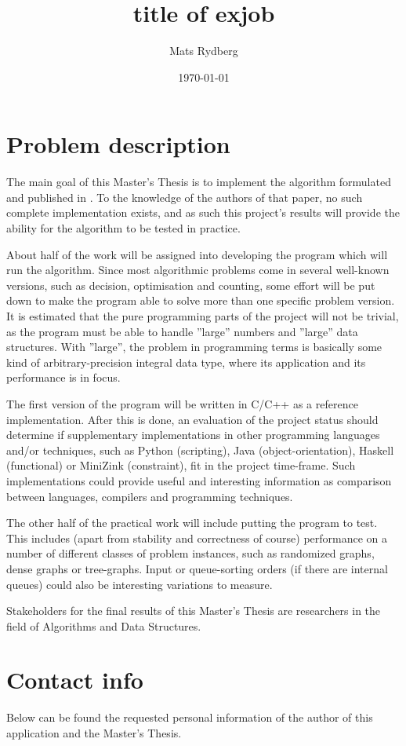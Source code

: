 \documentclass[a4paper, titlepage]{article}
\title{\huge{title of exjob}}
\author{Mats Rydberg}
\date{\today}
\begin{document}
\maketitle

\section*{Problem description}
The main goal of this Master's Thesis is to implement the algorithm formulated and published in \cite{covering}. To the knowledge of the authors of that paper, no such complete implementation exists, and as such this project's results will provide the ability for the algorithm to be tested in practice.

About half of the work will be assigned into developing the program which will run the algorithm. Since most algorithmic problems come in several well-known versions, such as decision, optimisation and counting, some effort will be put down to make the program able to solve more than one specific problem version. It is estimated that the pure programming parts of the project will not be trivial, as the program must be able to handle ''large'' numbers and ''large'' data structures. With ''large'', the problem in programming terms is basically some kind of arbitrary-precision integral data type, where its application and its performance is in focus. 

The first version of the program will be written in C/C++ as a reference implementation. After this is done, an evaluation of the project status should determine if supplementary implementations in other programming languages and/or techniques, such as Python (scripting), Java (object-orientation), Haskell (functional) or MiniZink (constraint), fit in the project time-frame. Such implementations could provide useful and interesting information as comparison between languages, compilers and programming techniques.

The other half of the practical work will include putting the program to test. This includes (apart from stability and correctness of course) performance on a number of different classes of problem instances, such as randomized graphs, dense graphs or tree-graphs. Input or queue-sorting orders (if there are internal queues) could also be interesting variations to measure.

Stakeholders for the final results of this Master's Thesis are researchers in the field of Algorithms and Data Structures.

\section*{Contact info}
Below can be found the requested personal information of the author of this application and the Master's Thesis.
\\
\end{document}
